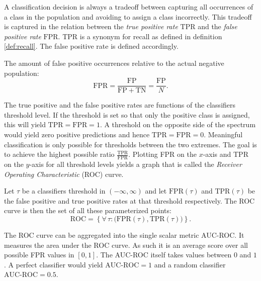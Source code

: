     A classification decision is always a tradeoff between capturing all occurrences of a class in the population and avoiding to assign a class incorrectly.
    This tradeoff is captured in the relation between the \emph{true positive rate} $\mathrm{TPR}$ and the \emph{false positive rate} $\mathrm{FPR}$.
    TPR is a synonym for recall as defined in definition \ref{def:recall}.
    The false positive rate is defined accordingly.
    \begin{definition}
        The amount of false positive occurrences relative to the actual negative population:
        \begin{equation}
            \mathrm{FPR} = \frac{\mathrm{FP}}{\mathrm{FP} + \mathrm{TN}} = \frac{\mathrm{FP}}{N} \text{.}
        \end{equation}
    \end{definition}
    The true positive and the false positive rates are functions of the classifiers threshold level.
    If the threshold is set so that only the positive class is assigned, this will yield $\mathrm{TPR} = \mathrm{FPR} = 1$.
    A threshold on the opposite side of the spectrum would yield zero positive predictions and hence $\mathrm{TPR} = \mathrm{FPR} = 0$.
    Meaningful classification is only possible for thresholds between the two extremes.
    The goal is to achieve the highest possible ratio $\frac{\mathrm{TPR}}{\mathrm{FPR}}$.
    Plotting FPR on the $x$-axis and TPR on the $y$-axis for all threshold levels yields a graph that is called the \emph{Receiver Operating Characteristic} (ROC) curve.
    \begin{definition}
        Let $\tau$ be a classifiers threshold in $(-\infty, \infty)$ and let $\mathrm{FPR}(\tau)$ and $\mathrm{TPR}(\tau)$ be the false positive and true positive rates at that threshold respectively.
        The ROC curve is then the set of all these parameterized points:
        \begin{equation}
            \mathrm{ROC} = \left\{ \forall \, \tau: \big( \mathrm{FPR}(\tau), \mathrm{TPR}(\tau) \big) \right\} \text{.}
        \end{equation}
    \end{definition}
    The ROC curve can be aggregated into the single scalar metric AUC-ROC.
    It  measures the area under the ROC curve.
    As such it is an average score over all possible FPR values in $[0,1]$.
    The AUC-ROC itself takes values between $0$ and $1$.
    A perfect classifier would yield $\text{AUC-ROC}=1$ and a random classifier $\text{AUC-ROC}=0.5$. 

